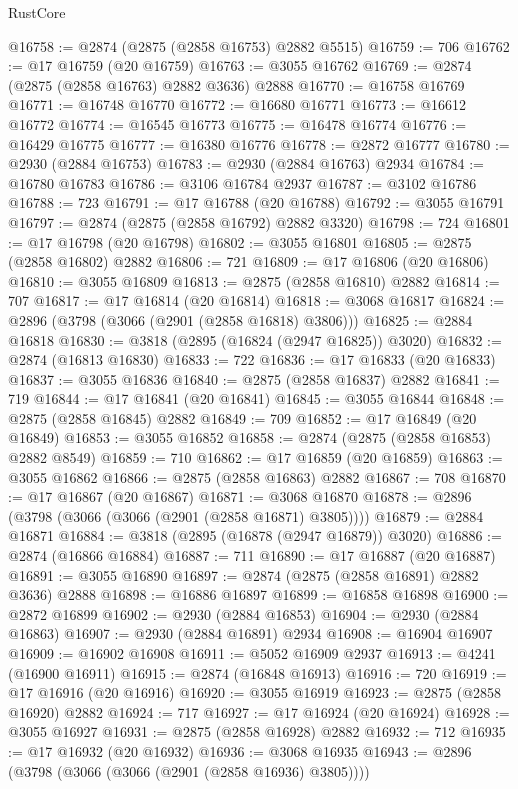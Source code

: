 \begin{lexlean}{RustCore}
\begin{coremodule}
@16758 := @2874 (@2875 (@2858 @16753) @2882 @5515)
@16759 := 706
@16762 := @17 @16759 (@20 @16759)
@16763 := @3055 @16762
@16769 := @2874 (@2875 (@2858 @16763) @2882 @3636) @2888
@16770 := @16758 @16769
@16771 := @16748 @16770
@16772 := @16680 @16771
@16773 := @16612 @16772
@16774 := @16545 @16773
@16775 := @16478 @16774
@16776 := @16429 @16775
@16777 := @16380 @16776
@16778 := @2872 @16777
@16780 := @2930 (@2884 @16753)
@16783 := @2930 (@2884 @16763) @2934
@16784 := @16780 @16783
@16786 := @3106 @16784 @2937
@16787 := @3102 @16786
@16788 := 723
@16791 := @17 @16788 (@20 @16788)
@16792 := @3055 @16791
@16797 := @2874 (@2875 (@2858 @16792) @2882 @3320)
@16798 := 724
@16801 := @17 @16798 (@20 @16798)
@16802 := @3055 @16801
@16805 := @2875 (@2858 @16802) @2882
@16806 := 721
@16809 := @17 @16806 (@20 @16806)
@16810 := @3055 @16809
@16813 := @2875 (@2858 @16810) @2882
@16814 := 707
@16817 := @17 @16814 (@20 @16814)
@16818 := @3068 @16817
@16824 := @2896 (@3798 (@3066 (@2901 (@2858 @16818) @3806)))
@16825 := @2884 @16818
@16830 := @3818 (@2895 (@16824 (@2947 @16825)) @3020)
@16832 := @2874 (@16813 @16830)
@16833 := 722
@16836 := @17 @16833 (@20 @16833)
@16837 := @3055 @16836
@16840 := @2875 (@2858 @16837) @2882
@16841 := 719
@16844 := @17 @16841 (@20 @16841)
@16845 := @3055 @16844
@16848 := @2875 (@2858 @16845) @2882
@16849 := 709
@16852 := @17 @16849 (@20 @16849)
@16853 := @3055 @16852
@16858 := @2874 (@2875 (@2858 @16853) @2882 @8549)
@16859 := 710
@16862 := @17 @16859 (@20 @16859)
@16863 := @3055 @16862
@16866 := @2875 (@2858 @16863) @2882
@16867 := 708
@16870 := @17 @16867 (@20 @16867)
@16871 := @3068 @16870
@16878 := @2896 (@3798 (@3066 (@3066 (@2901 (@2858 @16871) @3805))))
@16879 := @2884 @16871
@16884 := @3818 (@2895 (@16878 (@2947 @16879)) @3020)
@16886 := @2874 (@16866 @16884)
@16887 := 711
@16890 := @17 @16887 (@20 @16887)
@16891 := @3055 @16890
@16897 := @2874 (@2875 (@2858 @16891) @2882 @3636) @2888
@16898 := @16886 @16897
@16899 := @16858 @16898
@16900 := @2872 @16899
@16902 := @2930 (@2884 @16853)
@16904 := @2930 (@2884 @16863)
@16907 := @2930 (@2884 @16891) @2934
@16908 := @16904 @16907
@16909 := @16902 @16908
@16911 := @5052 @16909 @2937
@16913 := @4241 (@16900 @16911)
@16915 := @2874 (@16848 @16913)
@16916 := 720
@16919 := @17 @16916 (@20 @16916)
@16920 := @3055 @16919
@16923 := @2875 (@2858 @16920) @2882
@16924 := 717
@16927 := @17 @16924 (@20 @16924)
@16928 := @3055 @16927
@16931 := @2875 (@2858 @16928) @2882
@16932 := 712
@16935 := @17 @16932 (@20 @16932)
@16936 := @3068 @16935
@16943 := @2896 (@3798 (@3066 (@3066 (@2901 (@2858 @16936) @3805))))

\end{coremodule}
\end{lexlean}
